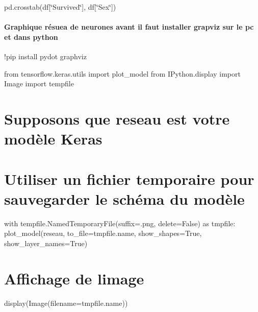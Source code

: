 pd.\+crosstab(df\mbox{[}\char`\"{}\+Survived\char`\"{}\mbox{]}, df\mbox{[}\char`\"{}\+Sex\char`\"{}\mbox{]})

\paragraph*{Graphique résuea de neurones avant il faut installer grapviz sur le pc et dans python}

!pip install pydot graphviz

from tensorflow.\+keras.\+utils import plot\+\_\+model from I\+Python.\+display import Image import tempfile \section*{Supposons que \textquotesingle{}reseau\textquotesingle{} est votre modèle Keras}

\section*{Utiliser un fichier temporaire pour sauvegarder le schéma du modèle}

with tempfile.\+Named\+Temporary\+File(suffix=\textquotesingle{}.png\textquotesingle{}, delete=False) as tmpfile\+: plot\+\_\+model(reseau, to\+\_\+file=tmpfile.\+name, show\+\_\+shapes=True, show\+\_\+layer\+\_\+names=True) \section*{Affichage de l\textquotesingle{}image}

display(Image(filename=tmpfile.\+name)) 